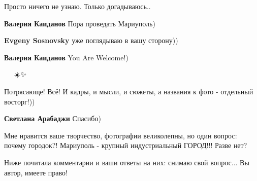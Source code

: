  
 
 
 
 

\qqSecCmt


Просто ничего не узнаю. Только догадываюсь..

\begin{itemize} %
\textbf{Валерия Каиданов} Пора проведать Мариуполь)

\textbf{Evgeny Sosnovsky} уже поглядываю в вашу сторону))

\textbf{Валерия Каиданов} You Are Welcome!)
\end{itemize} %


💖🤝👏👏👏☀️✨

Потрясающе! Всё! И кадры, и мысли, и сюжеты, а названия к фото - отдельный восторг!))

\begin{itemize} %
\textbf{Светлана Арабаджи} Спасибо)
\end{itemize} %


Мне нравится ваше творчество, фотографии великолепны, но один вопрос: почему
городок?! Мариуполь - крупный индустриальный ГОРОД!!! Разве нет?


Ниже почитала комментарии и ваши ответы на них: снимаю свой вопрос... Вы автор, имеете право!

